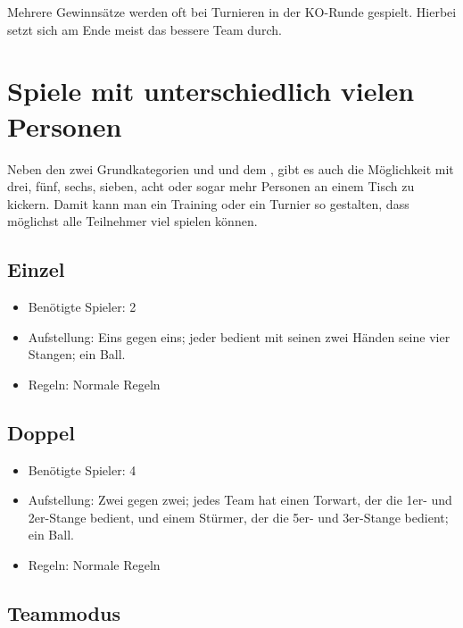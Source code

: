 Mehrere Gewinnsätze werden oft bei Turnieren in der KO-Runde gespielt. Hierbei setzt sich am Ende meist das bessere Team durch.




\section{Spiele mit unterschiedlich vielen Personen}
\label{spielformen:npersonen}

Neben den zwei Grundkategorien  und  und dem , gibt es auch die Möglichkeit mit drei, fünf, sechs, sieben, acht oder sogar mehr Personen an einem Tisch zu kickern.
Damit kann man ein Training oder ein Turnier so gestalten, dass möglichst alle Teilnehmer viel spielen können. 


\subsection{Einzel}
\label{spielformen:npersonen:einzel}

\begin{itemize}
\item Benötigte Spieler: 2
\item Aufstellung: Eins gegen eins; jeder bedient mit seinen zwei Händen seine vier Stangen; ein Ball.
\item Regeln: Normale Regeln 
\end{itemize}
 
\subsection{Doppel}
\label{spielformen:npersonen:doppel}

\begin{itemize}
\item Benötigte Spieler: 4
\item Aufstellung: Zwei gegen zwei; jedes Team hat einen Torwart, der die 1er- und 2er-Stange bedient, und einem Stürmer, der die 5er- und 3er-Stange bedient; ein Ball.
\item Regeln: Normale Regeln 
\end{itemize}

\subsection{Teammodus}
\label{spielformen:npersonen:team}


